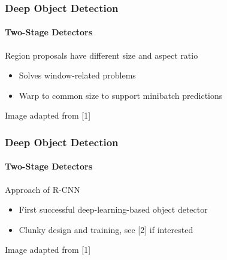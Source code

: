 \documentclass[xetex,professionalfont]{beamer}
\renewcommand\emph[1]{\textcolor{tuwcvl_cvl_blue}{#1}}
\begin{document}
\begin{frame}
	\frametitle{Deep Object Detection}
	\framesubtitle{Two-Stage Detectors}

	Region proposals have different size and aspect ratio
	\begin{itemize}
		\item Solves window-related problems %
		\item Warp to common size to support minibatch predictions
	\end{itemize}

	\medskip

	\begin{center}
		{\centering Image adapted from [1]}
	\end{center}

\end{frame}


\begin{frame}
	\frametitle{Deep Object Detection}
	\framesubtitle{Two-Stage Detectors}

	Approach of \emph{R-CNN}
	\begin{itemize}
		\item First successful deep-learning-based object detector
		\item Clunky design and training, see [2] if interested
	\end{itemize}

	\medskip

	\begin{center}
		{\centering Image adapted from [1]}
	\end{center}

\end{frame}
\end{document}
